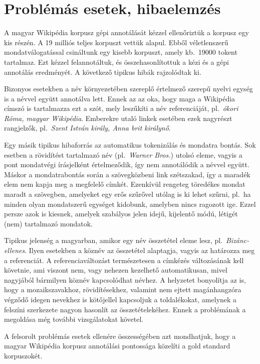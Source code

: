 \documentclass{llncs}
\begin{document}
\section{Problémás esetek, hibaelemzés}
\label{probl}

A magyar Wikipédia korpusz gépi annotálását kézzel ellenőriztük a korpusz egy kis részén. A 19 milliós teljes korpuszt vettük alapul. Ebből véletlenszerű mondatválogatással csináltunk egy kisebb korpuszt, amely kb.~19000 tokent tartalmaz. Ezt kézzel felannotáltuk, és összehasonlítottuk a kézi és a gépi annotálás eredményét. A következő tipikus hibák rajzolódtak ki. 

Bizonyos esetekben a név környezetében szereplő értelmező szerepű nyelvi egység is a névvel együtt annotálva lett. Ennek az az oka, hogy maga a Wikipédia címszó is tartalmazza ezt a szót, mely leszűkíti a név referenciáját, pl.~\textit{ókori Róma, magyar Wikipédia}. Emberekre utaló linkek esetében ezek nagyrészt rangjelzők, pl.~\textit{Szent István király, Anna brit királynő}. 

Egy másik tipikus hibaforrás az automatikus tokenizálás és mondatra bontás. Sok esetben a rövidítést tartalmazó név (pl.~\textit{Warner Bros.}) utolsó eleme, vagyis a pont mondatvégi írásjelként értelmeződik, így nem annotálódik a névvel együtt. Máskor a mondatrabontás során a szövegközbeni link szétszakad, így a maradék elem nem kapja meg a megfelelő címkét. Ezenkívül rengeteg töredékes mondat maradt a szövegben, amelyeket egy erős szűrővel utólag is ki lehet szűrni, pl.~ha minden olyan mondatszerű egységet kidobunk, amelyben nincs ragozott ige. Ezzel persze azok is kiesnek, amelyek szabályos jelen idejű, kijelentő módú, létigét (nem) tartalmazó mondatok. 

Tipikus jelenség a magyarban, amikor egy név összetétel eleme lesz, pl.~\textit{Bizánc-ellenes}. Ilyen esetekben a köznév az összetétel alaptagja, vagyis az határozza meg a referenciát. A referenciaváltozást természetesen a címkézés változásának kell követnie, ami viszont nem, vagy nehezen kezelhető automatikusan, mivel nagyjából bármilyen köznév kapcsolódhat névhez. A helyzetet bonyolítja az is, hogy a mozaikszavakhoz, rövidítésekhez, valamint nem ejtett magánhangzóra végződő idegen nevekhez is kötőjellel kapcsoljuk a toldalékokat, amelynek a felszíni szerkezete nagyon hasonlít az összetételekéhez. Ennek a problémának a megoldása még további vizsgálatokat követel. 

A felsorolt problémás esetek ellenére összességében azt mondhatjuk, hogy a magyar Wikipédia korpusz annotálási pontossága közelíti a gold standard korpuszokét. %
\end{document}
